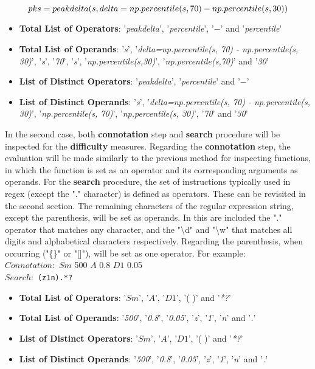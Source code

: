 \begin{equation}
\centering
pks = peakdelta(s, delta=np.percentile(s, 70) - np.percentile(s, 30))
\end{equation}


\begin{itemize}
\item \textbf{Total List of Operators}: '\textit{peakdelta}', '\textit{percentile}', '$-$' and '\textit{percentile}'
\item \textbf{Total List of Operands}: '\textit{s}', '\textit{delta=np.percentile(s, 70) - np.percentile(s, 30)}', '\textit{s}', '\textit{70}', '\textit{s}', '\textit{np.percentile(s,30)}', '\textit{np.percentile(s,70)}' and '\textit{30}'
\item \textbf{List of Distinct Operators}: '\textit{peakdelta}', '\textit{percentile}' and '$-$'
\item \textbf{List of Distinct Operands}: '\textit{s}', '\textit{delta=np.percentile(s, 70) - np.percentile(s, 30)}', '\textit{np.percentile(s, 70)}', '\textit{np.percentile(s, 30)}',  '\textit{70}' and '\textit{30}'
\end{itemize}

In the second case, both \textbf{connotation} step and \textbf{search} procedure will be inspected for the \textbf{difficulty} measures. Regarding the \textbf{connotation} step, the evaluation will be made similarly to the previous method for inspecting functions, in which the function is set as an operator and its corresponding arguments as operands. For the \textbf{search} procedure, the set of instructions typically used in \gls{regex} (except the "." character) is defined as operators\cite{regex}. These can be revisited in the second section. The remaining characters of the regular expression string, except the parenthesis, will be set as operands. In this are included the "." operator that matches any character, and the "\textbackslash d" and "\textbackslash w" that matches all digits and alphabetical characters respectively. Regarding the parenthesis, when occurring ("\{\}" or "[]"), will be set as one operator. For example:\\

{\centering
\textbf{$Connotation: $} $Sm$ 500  $A$ 0.8 $D1$ 0.05\\
\textbf{$Search: $} \texttt{(z1n).*?}\\ }

\begin{itemize}
\item \textbf{Total List of Operators}: '$Sm$', '$A$', '$D1$', '( )' and '\textit{*?}'
\item \textbf{Total List of Operands}: '\textit{500}', '\textit{0.8}', '\textit{0.05}', '\textit{z}', '\textit{1}', '\textit{n}' and '\textit{.}'
\item \textbf{List of Distinct Operators}: '$Sm$', '$A$', '$D1$', '( )' and '\textit{*?}'
\item \textbf{List of Distinct Operands}: '\textit{500}', '\textit{0.8}', '\textit{0.05}', '\textit{z}', '\textit{1}', '\textit{n}' and '\textit{.}'
\end{itemize}



